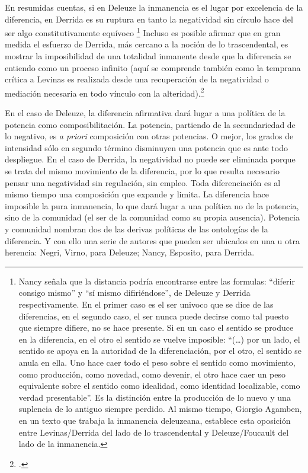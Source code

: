 En resumidas cuentas, si en Deleuze la inmanencia es el lugar por excelencia de la diferencia, en Derrida es su ruptura en tanto la negatividad sin círculo hace del ser algo constitutivamente equívoco \footnote{Nancy señala que la distancia podría encontrarse entre las formulas: \enquote{diferir consigo mismo} y \enquote{sí mismo difiriéndose}, de Deleuze y Derrida respectivamente. En el primer caso es el ser univoco que se dice de las diferencias, en el segundo caso, el ser nunca puede decirse como tal puesto que siempre difiere, no se hace presente. Si en un caso el sentido se produce en la diferencia, en el otro el sentido se vuelve imposible: \enquote{(\dots) por un lado, el sentido se apoya en la autoridad de la diferenciación, por el otro, el sentido se anula en ella. Uno hace caer todo el peso sobre el sentido como movimiento, como producción, como novedad, como devenir, el otro hace caer un peso equivalente sobre el sentido como idealidad, como identidad localizable, como verdad presentable}.\cite[256]{@6986-NANCY2008} Es la distinción entre la producción de lo nuevo y una suplencia de lo antiguo siempre perdido. Al mismo tiempo, Giorgio Agamben, en un texto que trabaja la inmanencia deleuzeana, establece esta oposición entre Levinas/Derrida del lado de lo trascendental y Deleuze/Foucault del lado de la inmanencia.\cite{@6987-AGAMBEN2008}} Incluso es posible afirmar que en gran medida el esfuerzo de Derrida, más cercano a la noción de lo trascendental, es mostrar la imposibilidad de una totalidad inmanente desde que la diferencia se entiendo como un proceso infinito (aquí se comprende también como la temprana crítica a Levinas es realizada desde una recuperación de la negatividad o mediación necesaria en todo vínculo con la alteridad).\footcite{@6989-DERRIDA1989}

En el caso de Deleuze, la diferencia afirmativa dará lugar a una política de la potencia como composibilitación. La potencia, partiendo de la secundariedad de lo negativo, es \emph{a priori} composición con otras potencias. O mejor, los grados de intensidad sólo en segundo término disminuyen una potencia que es ante todo despliegue. En el caso de Derrida, la negatividad no puede ser eliminada porque se trata del mismo movimiento de la diferencia, por lo que resulta necesario pensar una negatividad sin regulación, sin empleo. Toda diferenciación es al mismo tiempo una composición que expande y limita. La diferencia hace imposible la pura inmanencia, lo que dará lugar a una política no de la potencia, sino de la comunidad (el ser de la comunidad como su propia ausencia). Potencia y comunidad nombran dos de las derivas políticas de las ontologías de la diferencia. Y con ello una serie de autores que pueden ser ubicados en una u otra herencia: Negri, Virno, para Deleuze; Nancy, Esposito, para Derrida.

